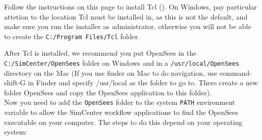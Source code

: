 Follow the instructions on this page to install Tcl
(). On Windows, pay particular
attetion to the location Tcl must be installed in, as this is not the
default, and make sure you run the installer as administrator,
otherwise you will not be able to create the \texttt{C:/Program
Files/Tcl} folder.

After Tcl is installed, we recommend you put OpenSees in
the \texttt{C:/SimCenter/OpenSees} folder on Windows and in
a \texttt{/usr/local/OpenSees} directory on the Mac (If you use finder
on Mac to do navigation, use command-shift-G in Finder and specify
/usr/local as the folder to go to. There create a new folder OpenSees
and copy the OpenSees application to this folder).\\


Now you need to add the \texttt{OpenSees} folder to the
system \texttt{PATH} environment variable to allow the SimCenter
workflow applications to find the OpenSees executable on your
computer. The steps to do this depend on your operating system:

